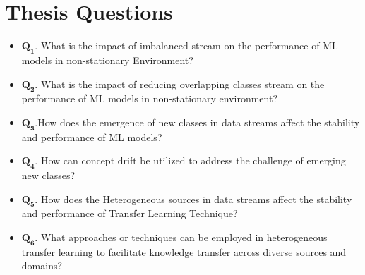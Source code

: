 \section{Thesis Questions}
\label{sec:1_introduction_questions}

\begin{itemize}
    \setlength{\itemsep}{2pt}
    \setlength{\parskip}{2pt}
       \item $\pmb{Q_1}$. What is the impact of imbalanced stream on the performance of ML models in non-stationary Environment?
        \item $\pmb{Q_2}$. What is the impact of reducing overlapping classes stream on the performance of ML models in non-stationary environment?
        \item $\pmb{Q_3}$.How does the emergence of new classes in data streams affect the stability and performance of ML models?
        \item $\pmb{Q_4}$. How can concept drift be utilized to address the challenge of emerging new classes?
        \item $\pmb{Q_5}$. How does the Heterogeneous sources in data streams affect the stability and performance of Transfer Learning Technique?
        \item $\pmb{Q_6}$. What approaches or techniques can be employed in heterogeneous transfer learning to facilitate knowledge transfer across diverse sources and domains?
    \end{itemize}
    